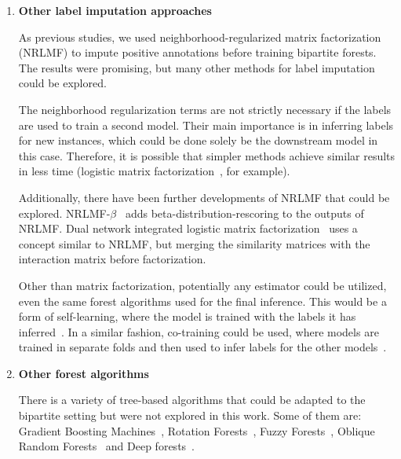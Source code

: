 \begin{enumerate}
    \item \textbf{Other label imputation approaches}

    As previous studies, we used neighborhood-regularized matrix factorization (NRLMF) to impute positive annotations before training bipartite forests. The results were promising, but many other methods for label imputation could be explored. 

    The neighborhood regularization terms are not strictly necessary if the labels are used to train a second model. Their main importance is in inferring labels for new instances, which could be done solely be the downstream model in this case.
    Therefore, it is possible that simpler methods achieve similar results in less time (logistic matrix factorization~\cite{johnsonlogistic}, for example).

    Additionally, there have been further developments of NRLMF that could be explored. NRLMF-$\beta$~\cite{ban2019nrlmf} adds beta-distribution-rescoring to the outputs of NRLMF. Dual network integrated logistic matrix factorization~\cite{zhang2019dnimf,li2019dnilmflda} uses a concept similar to NRLMF, but merging the similarity matrices with the interaction matrix before factorization.

    Other than matrix factorization, potentially any estimator could be utilized, even the same forest algorithms used for the final inference. This would be a form of self-learning, where the model is trained with the labels it has inferred~\cite{}. In a similar fashion, co-training could be used, where models are trained in separate folds and then used to infer labels for the other models~\cite{}.





    \item \textbf{Other forest algorithms}

    There is a variety of tree-based algorithms that could be adapted to the bipartite setting but were not explored in this work. Some of them are: Gradient Boosting Machines~\cite{}, Rotation Forests~\cite{}, Fuzzy Forests~\cite{}, Oblique Random Forests~\cite{} and Deep forests~\cite{}.


\end{enumerate}
